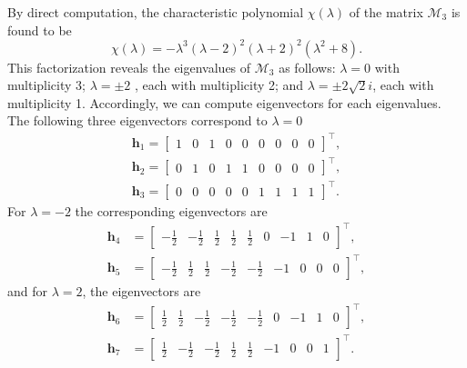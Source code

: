 \documentclass[english]{article}
\theoremstyle{plain}
\theoremstyle{definition}
\theoremstyle{remark}
\numberwithin{equation}{section}
\begin{document}
By direct computation, the characteristic polynomial $\chi(\lambda)$ of the matrix $\mathcal{M}_3$  is found to be
\begin{equation*}
\chi(\lambda) = -\lambda^3 (\lambda - 2)^2 (\lambda + 2)^2 (\lambda^2 + 8).
\end{equation*}
This factorization reveals the eigenvalues of $\mathcal{M}_3$ as follows: $\lambda = 0$ with multiplicity 3; $\lambda = \pm 2$ , each with multiplicity 2; and $\lambda = \pm 2\sqrt{2}i$, each with multiplicity 1.
Accordingly, we can compute eigenvectors for each  eigenvalues. The following three eigenvectors correspond to $\lambda = 0$
 \begin{align*}\label{}
 \mathbf{h}_1 = \begin{bmatrix} 1 & 0 & 1 & 0 & 0 & 0 & 0 & 0 & 0 \end{bmatrix}^\top,\\
\mathbf{h}_2 = \begin{bmatrix} 0 & 1 & 0 & 1 & 1 & 0 & 0 & 0 & 0 \end{bmatrix}^\top, \\
\mathbf{h}_3 = \begin{bmatrix} 0 & 0 & 0 & 0 & 0 & 1 & 1 & 1 & 1 \end{bmatrix}^\top.
 \end{align*}
For $\lambda = -2$ the corresponding eigenvectors are
 \begin{align*}\label{}
 \mathbf{h}_4 &= \begin{bmatrix} -\frac{1}{2} & -\frac{1}{2} & \frac{1}{2} & \frac{1}{2} & \frac{1}{2} & 0 & -1 & 1 & 0 \end{bmatrix}^\top, \\
\mathbf{h}_5 &= \begin{bmatrix} -\frac{1}{2} & \frac{1}{2} & \frac{1}{2} & -\frac{1}{2} & -\frac{1}{2} & -1 & 0 & 0 & 0 \end{bmatrix}^\top,
\end{align*}
 and for $\lambda = 2$, the eigenvectors are
  \begin{align*}
 \mathbf{h}_6& = \begin{bmatrix} \frac{1}{2} & \frac{1}{2} & -\frac{1}{2} & -\frac{1}{2} & -\frac{1}{2} & 0 & -1 & 1 & 0 \end{bmatrix}^\top, \\
 \mathbf{h}_7& = \begin{bmatrix} \frac{1}{2} & -\frac{1}{2} & -\frac{1}{2} & \frac{1}{2} & \frac{1}{2} & -1 & 0 & 0 & 1 \end{bmatrix}^\top.
\end{align*}
\end{document}
